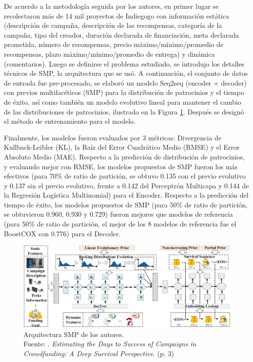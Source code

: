 De acuerdo a la metodología seguida por los autores, en primer lugar se recolectaron más de 14 mil proyectos de Indiegogo con información estática (descripción de campaña, descripción de las recompensas, categoría de la campaña, tipo del creador, duración declarada de financiación, meta declarada prometida, número de recompensas, precio máximo/mínimo/promedio de recompensas, plazo máximo/mínimo/promedio de entrega) y dinámica (comentarios). Luego se definirse el problema estudiado, se introdujo los detalles técnicos de SMP, la arquitectura que se usó. A continuación, el conjunto de datos de entrada fue pre-procesado, se elaboró un modelo Seq2seq (encoder + decoder) con previos multifacéticos (SMP) para la distribución de patrocinios y el tiempo de éxito, así como también un modelo evolutivo lineal para mantener el cambio de las distribuciones de patrocinios, ilustrado en la Figura \ref{2:fig124}. Después se designó el método de entrenamiento para el modelo.

Finalmente, los modelos fueron evaluados por 3 métricas: Divergencia de Kullback-Leibler (KL), la Raíz del Error Cuadrático Medio (RMSE) y el Error Absoluto Medio (MAE). Respecto a la predicción de distribución de patrocinios, y evaluando mejor con RMSE, los modelos propuestos de SMP fueron los más efectivos (para 70\% de ratio de partición, se obtuvo 0.135 con el previo evolutivo y 0.137 sin el previo evolutivo, frente a 0.142 del Perceptrón Multicapa y 0.144 de la Regresión Logística Multinomial) para el Encoder.
Respecto a la predicción del tiempo de éxito, los modelos propuestos de SMP (para 50\% de ratio de partición, se obtuvieron 0.960, 0.930 y 0.729) fueron mejores que modelos de referencia (para 50\% de ratio de partición, el mejor de los 8 modelos de referencia fue el BoostCOX con 0.776) para el Decoder.

\begin{figure}[!ht]
	\begin{center}
		\includegraphics[width=1\textwidth]{2/figures/jin2019.jpg}
		\caption[Arquitectura SMP de los autores]{Arquitectura SMP de los autores.\\
		Fuente: \cite{pr_jin2019dayssuccess}. \textit{Estimating the Days to Success of Campaigns
			in Crowdfunding: A Deep Survival Perspective}. (p. 3)}
		\label{2:fig124}
	\end{center}
\end{figure}

